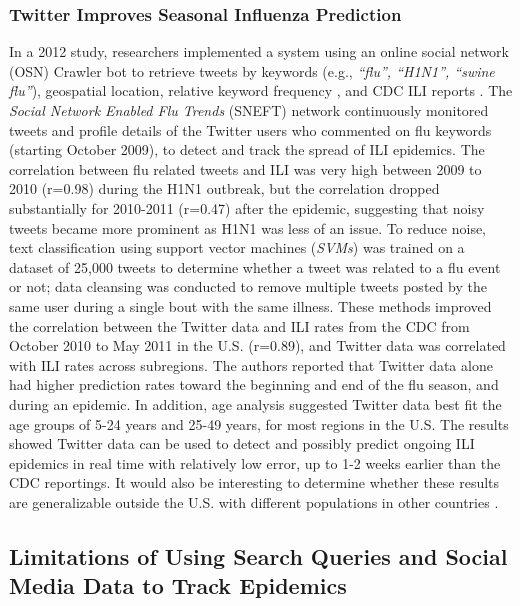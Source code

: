 \documentclass[sigconf]{acmart}
\begin{document}
\subsubsection{Twitter Improves Seasonal Influenza Prediction}

In a 2012 study, researchers implemented a system using an online social network (OSN)
Crawler bot to retrieve tweets by keywords (e.g., {\it ``flu'', ``H1N1'', ``swine flu''}), 
geospatial location, relative keyword frequency , and CDC ILI reports \cite{achrekar12}. 
The {\it Social Network Enabled Flu Trends} (SNEFT) network continuously monitored tweets 
and profile details of the Twitter users who commented on flu keywords (starting October 
2009), to detect and track the spread of ILI epidemics. The correlation between flu related 
tweets and ILI was very high between 2009 to 2010 (r=0.98) during the H1N1 outbreak, but 
the correlation dropped substantially for 2010-2011 (r=0.47) after the epidemic, suggesting 
that noisy tweets became more prominent as H1N1 was less of an issue. To reduce noise, text 
classification using support vector machines ({\it SVMs}) was trained on a dataset of 
25,000 tweets to determine whether a tweet was related to a flu event or not; data cleansing 
was conducted to remove multiple tweets posted by the same user during a single bout with 
the same illness. These methods improved the correlation between the Twitter data and ILI 
rates from the CDC from October 2010 to May 2011 in the U.S. (r=0.89), and Twitter data was 
correlated with ILI rates across subregions. The authors reported that Twitter data alone 
had higher prediction rates toward the beginning and end of the flu season, and during an 
epidemic. In addition, age analysis suggested Twitter data best fit the age groups of 5-24 
years and 25-49 years,  for most regions in the U.S. The results showed Twitter data can be 
used to detect and possibly predict ongoing ILI epidemics in real time with relatively 
low error, up to 1-2 weeks earlier than the CDC reportings. It would also be interesting to 
determine whether these results are generalizable outside the U.S. with different 
populations in other countries \cite{yuan13}.


\subsection{Limitations of Using Search Queries and Social Media Data to Track Epidemics}
\end{document}
